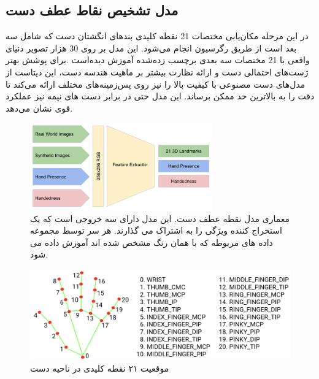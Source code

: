 \subsection{مدل تشخیص نقاط عطف دست}
در این مرحله مکان‌یابی مختصات 21 نقطه کلیدی بند‌های انگشتان دست که شامل سه بعد است از طریق رگرسیون 
انجام می‌شود. این مدل بر روی 30 هزار تصویر دنیای واقعی با 21 مختصات سه بعدی برچسب زده‌شده 
آموزش دیده‌است .برای پوشش بهتر ژست‌های احتمالی دست و ارائه نظارت بیشتر بر ماهیت هندسه دست، این دیتاست از مدل‌های دست مصنوعی
با کیفیت بالا را نیز روی پس‌زمینه‌های مختلف ارائه می‌کند تا دقت را به بالاترین حد ممکن برساند. این مدل حتی در برابر دست های نیمه نیز عملکرد قوی نشان می‌دهد. \cite{zhang2020mediapipe}

\begin{figure}[h]
    \centering
    \includegraphics[width=0.7\textwidth]{landmark.png}
    \caption{معماری مدل نقطه عطف دست. این مدل دارای سه خروجی است که یک استخراج کننده ویژگی را به اشتراک می گذارند. هر سر توسط مجموعه داده های مربوطه که با همان رنگ مشخص شده اند آموزش داده می شود.}
\end{figure}

\begin{figure}[h]
    \centering
    \includegraphics[width=1\textwidth]{hand-landmarks.png}
    \caption{موقعیت ۲۱ نقطه کلیدی در ناحیه دست}
\end{figure}



